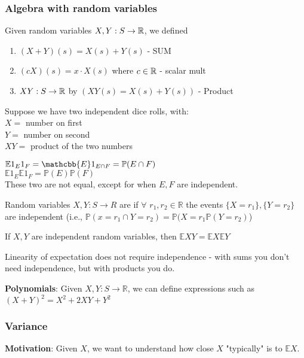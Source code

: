 \documentclass[11pt]{scrartcl}
\begin{document}
\subsubsection{Algebra with random variables}
Given random variables $X, Y: S \to \mathbb R$, we defined \begin{enumerate}
    \item $(X+Y)(s) = X(s) + Y(s)$ - SUM
    \item $(cX)(s) = x\cdot X(s)$ where $c \in \mathbb R$ - scalar mult
    \item $XY: S \to \mathbb R$ by $(XY(s) = X(s) + Y(s))$ - Product
\end{enumerate}
\begin{example}
    Suppose we have two independent dice rolls, with: \\
    $X =$ number on first\\
    $Y = $ number on second\\
    $XY = $ product of the two numbers
\end{example}
$\mathbb{E} 1_E1_F = \mathcbb{E}1_{E \cap F} = \mathbb{P}(E\cap F) $\\
$\mathbb{E} 1_E \mathbb{E} 1_F = \mathbb{P}(E)\mathbb{P}(F)$\\
These two are not equal, except for when $E, F$ are independent.
\begin{definition}
    Random variables $X, Y: S \to R$ are  if $\forall $ $r_1, r_2 \in \mathbb{R}$ the events $\{X= r_1\} , \{Y=r_2\}$ are independent (i.e., $\mathbb{P}(x=r_1 \cap Y=r_2) = \mathbb{P}(X=r_1 \mathbb{P}(Y=r_2)$)
\end{definition}
\begin{theorem}
    If $X, Y$ are independent random variables, then $\mathbb{E}XY = \mathbb{E}X \mathbb{E}Y $
\end{theorem}

\begin{remark}
    Linearity of expectation does not require independence - with sums you don't need independence, but with products you do.
\end{remark}


\textbf{Polynomials}: Given $X, Y : S \to \mathbb{R}$, we can define expressions such as $(X +Y)^2 = X^2 + 2XY + Y^2$



\subsubsection{Variance} 
\textbf{Motivation}: Given $X$, we want to understand how close $X$ "typically" is to $\mathbb{E}X$. 
\end{document}
